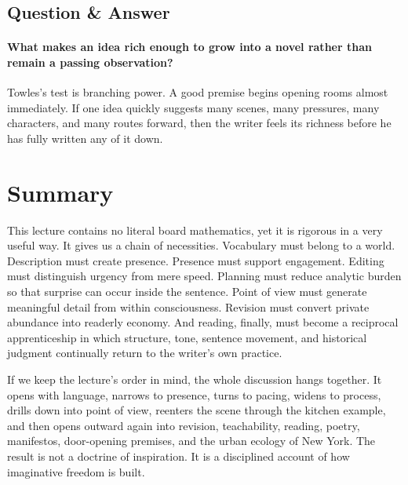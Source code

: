 \subsection{Question \& Answer}

\paragraph{What makes an idea rich enough to grow into a novel rather than remain a passing observation?}

Towles's test is branching power. A good premise begins opening rooms almost immediately. If one idea quickly suggests many scenes, many pressures, many characters, and many routes forward, then the writer feels its richness before he has fully written any of it down.

\section{Summary}

This lecture contains no literal board mathematics, yet it is rigorous in a very useful way. It gives us a chain of necessities. Vocabulary must belong to a world. Description must create presence. Presence must support engagement. Editing must distinguish urgency from mere speed. Planning must reduce analytic burden so that surprise can occur inside the sentence. Point of view must generate meaningful detail from within consciousness. Revision must convert private abundance into readerly economy. And reading, finally, must become a reciprocal apprenticeship in which structure, tone, sentence movement, and historical judgment continually return to the writer's own practice.

If we keep the lecture's order in mind, the whole discussion hangs together. It opens with language, narrows to presence, turns to pacing, widens to process, drills down into point of view, reenters the scene through the kitchen example, and then opens outward again into revision, teachability, reading, poetry, manifestos, door-opening premises, and the urban ecology of New York. The result is not a doctrine of inspiration. It is a disciplined account of how imaginative freedom is built.